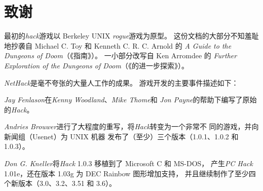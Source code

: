 \documentclass[a4paper, 10pt]{article}
\newcommand{\nd}{\noindent}
\begin{document}
\section{致谢}
最初的{\it hack\/}游戏以 Berkeley UNIX {\it rogue\/}游戏为原型。
这份文档的大部分不知羞耻地抄袭自 Michael C. Toy 和 Kenneth C. R. C. Arnold 的
{\it A Guide to the Dungeons of Doom}（《\zhTransDungeonsOfDoom{}指南》）。
一小部分改写自 Ken Arromdee 的
{\it Further Exploration of the Dungeons of Doom}（《\zhTransDungeonsOfDoom{}的进一步探索》）。

{\it NetHack\/}是毫不夸张的大量人工作的成果。
游戏开发的主要事件描述如下：

\bigskip
{\it Jay Fenlason\/}在{\it Kenny Woodland}、{\it Mike Thome}和
{\it Jon Payne}的帮助下编写了原始的{\it Hack\/}。

\medskip
{\it Andries Brouwer\/}进行了大程度的重写，将{\it Hack\/}转变为一个非常不
同的游戏，并向新闻组（Usenet）为 UNIX 机器
发布了（至少）三个版本（1.0.1、1.0.2 和 1.0.3）。

\medskip
{\it Don G. Kneller\/}将{\it Hack\/} 1.0.3 移植到了 Microsoft C 和 MS-DOS，
产生{\it PC Hack\/} 1.01e，还在版本 1.03g 为 DEC Rainbow 图形增加支持，
并且继续制作了至少四个新版本（3.0、3.2、3.51 和 3.6）。
\end{document}
